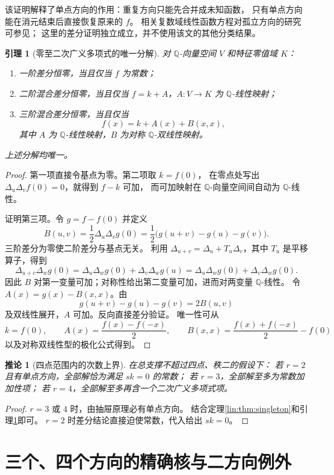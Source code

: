 \documentclass[11pt,a4paper,oneside,openany]{book}
\theoremstyle{lecture}
\newtheorem{lemma}[theorem]{引理}
\newtheorem{corollary}[theorem]{推论}
\newcommand{\Q}{\mathbb Q}
\numberwithin{equation}{section}
\begin{document}
该证明解释了单点方向的作用：重复方向只能先合并成未知函数，
只有单点方向能在消元结束后直接恢复原来的 $f$。
相关复数域线性函数方程对孤立方向的研究可参见\cite{KissVarga}；
这里的差分证明独立成立，并不使用该文的其他分类结果。

\begin{lemma}[零至二次广义多项式的唯一分解]\label{lin:lem:lowdegree}
对 $\Q$-向量空间 $V$ 和特征零值域 $K$：
\begin{enumerate}
\item 一阶差分恒零，当且仅当 $f$ 为常数；
\item 二阶混合差分恒零，当且仅当 $f=k+A$，$A:V\to K$ 为 $\Q$-线性映射；
\item 三阶混合差分恒零，当且仅当
\[
 f(x)=k+A(x)+B(x,x),
\]
其中 $A$ 为 $\Q$-线性映射，$B$ 为对称 $\Q$-双线性映射。
\end{enumerate}
上述分解均唯一。
\end{lemma}
\begin{proof}
第一项直接令基点为零。第二项取 $k=f(0)$，
在零点处写出 $\Delta_u\Delta_vf(0)=0$，就得到 $f-k$ 可加，
而可加映射在 $\Q$-向量空间间自动为 $\Q$-线性。

证明第三项。令 $g=f-f(0)$ 并定义
\[
 B(u,v)=\frac12\Delta_u\Delta_vg(0)
 =\frac12\bigl(g(u+v)-g(u)-g(v)\bigr).
\]
三阶差分为零使二阶差分与基点无关。
利用 $\Delta_{u+v}=\Delta_u+T_u\Delta_v$，其中 $T_u$ 是平移算子，得到
\[
 \Delta_{u+v}\Delta_wg(0)
 =\Delta_u\Delta_wg(0)+\Delta_v\Delta_wg(u)
 =\Delta_u\Delta_wg(0)+\Delta_v\Delta_wg(0).
\]
因此 $B$ 对第一变量可加；对称性给出第二变量可加，进而对两变量 $\Q$-线性。
令 $A(x)=g(x)-B(x,x)$。由
\[
 g(u+v)-g(u)-g(v)=2B(u,v)
\]
及双线性展开，$A$ 可加。反向直接差分验证。
唯一性可从
\[
 k=f(0),\qquad
 A(x)=\frac{f(x)-f(-x)}2,\qquad
 B(x,x)=\frac{f(x)+f(-x)}2-f(0)
\]
以及对称双线性型的极化公式得到。
\end{proof}

\begin{corollary}[四点范围内的次数上界]\label{lin:cor:degreebound}
在总支撑不超过四点、秩二的假设下：
若 $r=2$ 且有单点方向，全部解恰为满足 $sk=0$ 的常数；
若 $r=3$，全部解至多为常数加加性项；
若 $r=4$，全部解至多再含一个二次广义多项式项。
\end{corollary}
\begin{proof}
$r=3$ 或 $4$ 时，由抽屉原理必有单点方向。
结合定理\ref{lin:thm:singleton}和引理\ref{lin:lem:lowdegree}即可。
$r=2$ 时差分结论直接迫使常数，代入给出 $sk=0$。
\end{proof}

\section{三个、四个方向的精确核与二方向例外}\label{lin:sec:kernelclassification}
\end{document}
